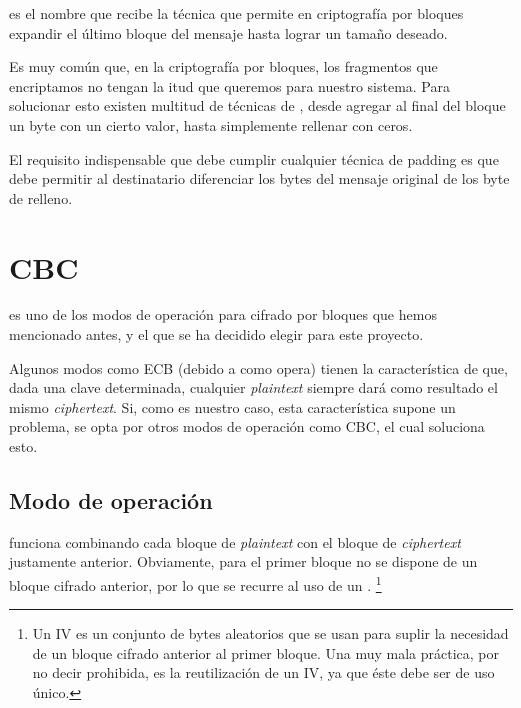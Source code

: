   es el nombre que recibe la técnica que permite en criptografía por bloques expandir el último bloque del mensaje hasta lograr un tamaño deseado.

 Es muy común que, en la criptografía por bloques, los fragmentos que encriptamos no tengan la itud que queremos para nuestro sistema.
 Para solucionar esto existen multitud de técnicas de , desde agregar al final del bloque un byte con un cierto valor, hasta simplemente rellenar con ceros.

 El requisito indispensable que debe cumplir cualquier técnica de padding es que debe permitir al destinatario diferenciar los bytes del mensaje original de los byte de relleno. \emph{\parencite{Reference8}}


 \section{CBC}

  es uno de los modos de operación para cifrado por bloques que hemos mencionado antes,
 y el que se ha decidido elegir para este proyecto.

 Algunos modos como ECB (debido a como opera) tienen la característica de que, dada una clave determinada,
 cualquier \emph{plaintext} siempre dará como resultado el mismo \emph{ciphertext}.
 Si, como es nuestro caso, esta característica supone un problema,
 se opta por otros modos de operación como CBC, el cual soluciona esto. \emph{\parencite{Reference23}}

 \subsection{Modo de operación}

  funciona combinando cada bloque de \emph{plaintext} con el bloque de \emph{ciphertext} justamente anterior.
 Obviamente, para el primer bloque no se dispone de un bloque cifrado anterior,
 por lo que se recurre al uso de un .
 \footnote{Un IV es un conjunto de bytes aleatorios que se usan para suplir la necesidad de un bloque cifrado anterior al primer bloque.
 Una muy mala práctica, por no decir prohibida, es la reutilización de un IV, ya que éste debe ser de uso único.}

